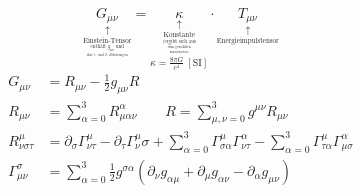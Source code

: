 \begin{itemize}
		\begin{equation*}
			\underset{\underset{\underset{\underset{\text{ihre 1. und 2. Ableitungen}}{\text{enthält $g_{\mu\nu}$ und}}}{\text{Einstein-Tensor}}}{\uparrow}}{G_{\mu\nu}}=\underset{\kappa=\frac{8\pi G}{c^4}\ \left[\text{SI}\right]}{\underset{\underset{\underset{\underset{\underset{\text{Einheitensystem)}}{\text{dem gewählten}}}{\text{(ergibt sich aus}}}{\text{Konstante}}}{\uparrow}}{\kappa}}\cdot \underset{\underset{\text{Energieimpulstensor}}{\uparrow}}{T_{\mu\nu}}
		\end{equation*}
		\begin{align*}
			G_{\mu\nu}&=R_{\mu\nu}-\frac{1}{2}g_{\mu\nu}R\\
			R_{\mu\nu}&=\sum\limits_{\alpha=0}^3R^\alpha_{\mu\alpha\nu} \qquad R=\sum\limits_{\mu,\nu=0}^3g^{\mu\nu}R_{\mu\nu}\\
			R_{\nu\sigma\tau}^\mu&=\partial_\sigma \Gamma^\mu_{\nu\tau}-\partial_\tau \Gamma^\mu_\nu\sigma + \sum\limits_{\alpha=0}^3\Gamma^\mu_{\sigma\alpha}\Gamma^\alpha_{\nu\tau}-\sum\limits_{\alpha=0}^3\Gamma^\mu_{\tau\alpha}\Gamma^\alpha_{\mu\sigma}\\
			\Gamma^\sigma_{\mu\nu}&=\sum\limits_{\alpha=0}^3\frac{1}{2}g^{\sigma\alpha}\left(\partial_\nu g_{\alpha\mu}+\partial_\mu g_{\alpha\nu}-\partial_\alpha g_{\mu\nu}\right)
		\end{align*}
\end{itemize}
